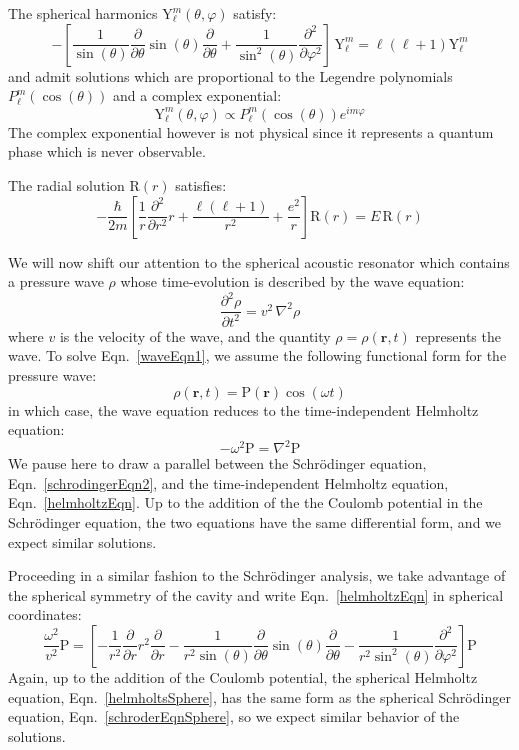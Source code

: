 \documentclass[12pt]{article}
\renewcommand{\vec}[1]{\mathbf{#1}} %
\newcommand{\ppd}[1]{\frac{\partial}{\partial#1}}
\newcommand{\ppsd}[1]{\frac{\partial^2}{\partial #1^2}}
\newcommand{\ppsnd}[2]{\frac{\partial^2 #1}{\partial #2^2}}
\newcommand{\lap}{\nabla^2}
\let\originaleqref=\eqref
\renewcommand{\eqref}{Eqn.\ \originaleqref}
\begin{document}
The spherical harmonics $\mathrm{Y}_\ell^m(\theta,\varphi)$ satisfy:
\begin{equation}
\label{sphericalHarmonic}
	-\left[ \frac{1}{\sin(\theta)}\ppd{\theta}\sin(\theta)\ppd{\theta} + \frac{1}{\sin^2(\theta)} \ppsd{\varphi} \right] \, \mathrm{Y}_\ell^m = \ell(\ell+1)\mathrm{Y}_\ell^m
\end{equation}
and admit solutions which are proportional to the Legendre polynomials $P_\ell^m(\cos(\theta))$ and a complex exponential:
\begin{equation}
	\mathrm{Y}_\ell^m(\theta,\varphi) \propto P_\ell^m(\cos(\theta))e^{im\varphi}
\end{equation}
The complex exponential however is not physical since it represents a quantum phase which is never observable.

The radial solution $\mathrm{R}(r)$ satisfies:
\begin{equation}
\label{radialSoln}
	- \frac{\hbar}{2m} \left[ \frac{1}{r} \ppsd{r}r + \frac{\ell(\ell+1)}{r^2} + \frac{e^2}{r} \right] \mathrm{R}(r) = E \, \mathrm{R}(r)
\end{equation}



We will now shift our attention to the spherical acoustic resonator which contains a pressure wave $\rho$ whose time-evolution is described by the wave equation:
\begin{equation}
	\label{waveEqn1}
	\ppsnd{\rho}{t} = v^2 \, \lap\rho
\end{equation}
where $v$ is the velocity of the wave, and the quantity $\rho = \rho(\vec{r},t)$ represents the wave. To solve \eqref{waveEqn1}, we assume the following functional form for the pressure wave:
\begin{equation}
\label{waveSoln}
	\rho(\vec{r},t) = \mathrm{P}(\vec{r})\cos(\omega t)
\end{equation}
in which case, the wave equation reduces to the time-independent Helmholtz equation:
\begin{equation}
\label{helmholtzEqn}
	-\omega^2 \mathrm{P} = \lap \mathrm{P}
\end{equation}
We pause here to draw a parallel between the Schr\"odinger equation, \eqref{schrodingerEqn2}, and the time-independent Helmholtz equation, \eqref{helmholtzEqn}. Up to the addition of the the Coulomb potential in the Schr\"odinger equation, the two equations have the same differential form, and we expect similar solutions.

Proceeding in a similar fashion to the Schr\"odinger analysis, we take advantage of the spherical symmetry of the cavity and write \eqref{helmholtzEqn} in spherical coordinates:
\begin{equation}
\label{helmholtsSphere}
	\frac{\omega^2}{v^2} \mathrm{P} = \left[ -\frac{1}{r^2} \ppd{r}r^2\ppd{r} - \frac{1}{r^2\sin(\theta)}\ppd{\theta}\sin(\theta)\ppd{\theta} -\frac{1}{r^2\sin^2(\theta)} \ppsd{\varphi} \right] \mathrm{P}
\end{equation}
Again, up to the addition of the Coulomb potential, the spherical Helmholtz equation, \eqref{helmholtsSphere}, has the same form as the spherical Schr\"odinger equation,  \eqref{schroderEqnSphere}, so we expect similar behavior of the solutions.
\end{document}
